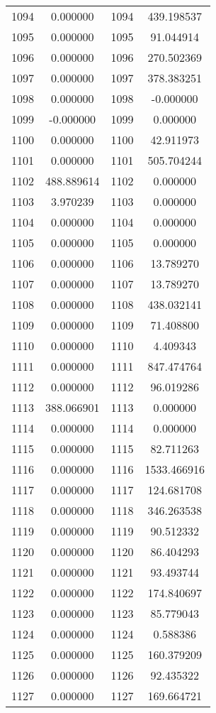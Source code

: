 \documentclass[12pt]{article}
\begin{document}
\begin{longtable}{@{}cccc@{}}
1094 & 0.000000 & 1094 & 439.198537 \\
1095 & 0.000000 & 1095 & 91.044914 \\
1096 & 0.000000 & 1096 & 270.502369 \\
1097 & 0.000000 & 1097 & 378.383251 \\
1098 & 0.000000 & 1098 & -0.000000 \\
1099 & -0.000000 & 1099 & 0.000000 \\
1100 & 0.000000 & 1100 & 42.911973 \\
1101 & 0.000000 & 1101 & 505.704244 \\
1102 & 488.889614 & 1102 & 0.000000 \\
1103 & 3.970239 & 1103 & 0.000000 \\
1104 & 0.000000 & 1104 & 0.000000 \\
1105 & 0.000000 & 1105 & 0.000000 \\
1106 & 0.000000 & 1106 & 13.789270 \\
1107 & 0.000000 & 1107 & 13.789270 \\
1108 & 0.000000 & 1108 & 438.032141 \\
1109 & 0.000000 & 1109 & 71.408800 \\
1110 & 0.000000 & 1110 & 4.409343 \\
1111 & 0.000000 & 1111 & 847.474764 \\
1112 & 0.000000 & 1112 & 96.019286 \\
1113 & 388.066901 & 1113 & 0.000000 \\
1114 & 0.000000 & 1114 & 0.000000 \\
1115 & 0.000000 & 1115 & 82.711263 \\
1116 & 0.000000 & 1116 & 1533.466916 \\
1117 & 0.000000 & 1117 & 124.681708 \\
1118 & 0.000000 & 1118 & 346.263538 \\
1119 & 0.000000 & 1119 & 90.512332 \\
1120 & 0.000000 & 1120 & 86.404293 \\
1121 & 0.000000 & 1121 & 93.493744 \\
1122 & 0.000000 & 1122 & 174.840697 \\
1123 & 0.000000 & 1123 & 85.779043 \\
1124 & 0.000000 & 1124 & 0.588386 \\
1125 & 0.000000 & 1125 & 160.379209 \\
1126 & 0.000000 & 1126 & 92.435322 \\
1127 & 0.000000 & 1127 & 169.664721 \\

\end{longtable}
\end{document}
